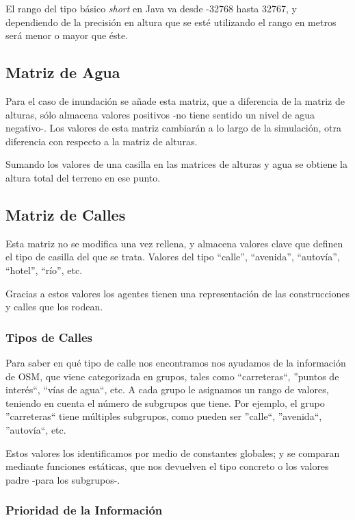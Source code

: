 El rango del tipo básico {\em short} en Java va desde -32768 hasta 32767, y
dependiendo de la precisión en altura que se esté utilizando el rango en metros
será menor o mayor que éste.

\subsection*{Matriz de Agua}

Para el caso de inundación se añade esta matriz, que a diferencia de la matriz
de alturas, sólo almacena valores positivos -no tiene sentido un nivel de agua
negativo-. Los valores de esta matriz cambiarán a lo largo de la simulación,
otra diferencia con respecto a la matriz de alturas.

Sumando los valores de una casilla en las matrices de alturas y agua se obtiene
la altura total del terreno en ese punto.

\subsection*{Matriz de Calles}

Esta matriz no se modifica una vez rellena, y almacena valores clave que definen
el tipo de casilla del que se trata. Valores del tipo ``calle'', ``avenida'',
``autovía'', ``hotel'', ``río'', etc.

Gracias a estos valores los agentes tienen una representación de las
construcciones y calles que los rodean.

\subsubsection*{Tipos de Calles}

Para saber en qué tipo de calle nos encontramos nos ayudamos de la información
de OSM, que viene categorizada en grupos, tales como ``carreteras``, ''puntos
de interés``, ``vías de agua``, etc. A cada grupo le asignamos un rango de
valores, teniendo en cuenta el número de subgrupos que tiene. Por ejemplo, el
grupo ''carreteras`` tiene múltiples subgrupos, como pueden ser ''calle``,
''avenida``, ''autovía``, etc.

Estos valores los identificamos por medio de constantes globales; y se
comparan mediante funciones estáticas, que nos devuelven el tipo concreto o los
valores padre -para los subgrupos-.

\subsubsection*{Prioridad de la Información}

